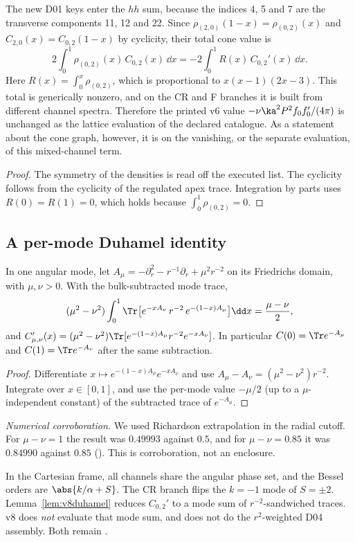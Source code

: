 \begin{proposition}
\label{prop:v8hidden}
The new D01 keys enter the \(hh\) sum, because the indices 4, 5
and 7 are the transverse components 11, 12 and 22.
Since \(\rho_{(2,0)}(1-x)=\rho_{(0,2)}(x)\) and
\(C_{2,0}(x)=C_{0,2}(1-x)\) by cyclicity, their total cone value is
\[
 2\int_0^1\rho_{(0,2)}(x)\,C_{0,2}(x)\,\dd x
 =-2\int_0^1R(x)\,C_{0,2}'(x)\,\dd x .
\]
Here \(R(x)=\int_0^x\rho_{(0,2)}\), which is proportional to
\(x(x-1)(2x-3)\).
This total is generically nonzero, and on the CR and F branches it
is built from different channel spectra.
Therefore the printed v6 value
\(-\nu\ka^2P^2f_0f'_0/(4\pi)\) is unchanged as the lattice
evaluation of the declared catalogue. As a statement about the
cone graph, however, it is \CONDITIONAL{} on the vanishing, or the
separate evaluation, of this mixed-channel term.
\end{proposition}

\begin{proof}
The symmetry of the densities is read off the executed list. The
cyclicity follows from the cyclicity of the regulated apex trace.
Integration by parts uses \(R(0)=R(1)=0\), which holds because
\(\int_0^1\rho_{(0,2)}=0\).
\end{proof}

\subsection{A per-mode Duhamel identity}

\begin{lemma}
\label{lem:v8duhamel}
In one angular mode, let
\(A_\mu=-\partial_r^2-r^{-1}\partial_r+\mu^2r^{-2}\) on its
Friedrichs domain, with \(\mu,\nu>0\). With the bulk-subtracted
mode trace,
\[
 (\mu^2-\nu^2)\int_0^1\Tr\bigl[e^{-xA_\nu}\,r^{-2}\,e^{-(1-x)A_\mu}\bigr]\dd x
 =\frac{\mu-\nu}2 ,
\]
and \(C_{\mu,\nu}'(x)=(\mu^2-\nu^2)\Tr[e^{-(1-x)A_\mu}r^{-2}e^{-xA_\nu}]\).
In particular \(C(0)=\Tr e^{-A_\mu}\) and \(C(1)=\Tr e^{-A_\nu}\)
after the same subtraction.
\end{lemma}

\begin{proof}
Differentiate \(x\mapsto e^{-(1-x)A_\mu}e^{-xA_\nu}\) and use
\(A_\mu-A_\nu=(\mu^2-\nu^2)r^{-2}\). Integrate over \(x\in[0,1]\),
and use the per-mode value \(-\mu/2\) (up to a \(\mu\)-independent
constant) of the subtracted trace of \(e^{-A_\mu}\).
\end{proof}

\noindent\emph{Numerical corroboration.} We used Richardson
extrapolation in the radial cutoff. For \(\mu-\nu=1\) the result
was \(0.49993\) against \(0.5\), and for \(\mu-\nu=0.85\) it was
\(0.84990\) against \(0.85\)
(). This is corroboration, not an
enclosure.

In the Cartesian frame, all channels share the angular phase set,
and the Bessel orders are \(\abs{k/\alpha+S}\). The CR branch flips
the \(k=-1\) mode of \(S=\pm2\). Lemma~\ref{lem:v8duhamel} reduces
\(C_{0,2}'\) to a mode sum of \(r^{-2}\)-sandwiched traces.
v8 does \emph{not} evaluate that mode sum, and does not do the
\(r^2\)-weighted D04 assembly. Both remain \OPEN.

